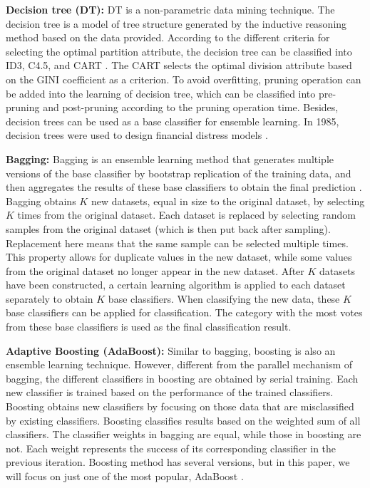 \documentclass[review]{elsarticle}
\begin{document}
\textbf{Decision tree (DT):} DT is a non-parametric data mining technique. The decision tree is a model of tree structure generated by the inductive reasoning method based on the data provided. According to the different criteria for selecting the optimal partition attribute, the decision tree can be classified into ID3, C4.5, and CART \citep{breiman1984classification}. The CART selects the optimal division attribute based on the GINI coefficient as a criterion. To avoid overfitting, pruning operation can be added into the learning of decision tree, which can be classified into pre-pruning and post-pruning according to the pruning operation time. Besides, decision trees can be used as a base classifier for ensemble learning. In 1985, decision trees were used to design financial distress models \citep{Frydman1985}.

\textbf{Bagging:} Bagging is an ensemble learning method that generates multiple versions of the base classifier by bootstrap replication of the training data, and then aggregates the results of these base classifiers to obtain the final prediction \citep{Breiman1996}. Bagging obtains $K$ new datasets, equal in size to the original dataset, by selecting $K$ times from the original dataset. Each dataset is replaced by selecting random samples from the original dataset (which is then put back after sampling). Replacement here means that the same sample can be selected multiple times. This property allows for duplicate values in the new dataset, while some values from the original dataset no longer appear in the new dataset. After $K$ datasets have been constructed, a certain learning algorithm is applied to each dataset separately to obtain $K$ base classifiers. When classifying the new data, these $K$ base classifiers can be applied for classification. The category with the most votes from these base classifiers is used as the final classification result.

\textbf{Adaptive Boosting (AdaBoost):} Similar to bagging, boosting is also an ensemble learning technique. However, different from the parallel mechanism of bagging, the different classifiers in boosting are obtained by serial training. Each new classifier is trained based on the performance of the trained classifiers. Boosting obtains new classifiers by focusing on those data that are misclassified by existing classifiers. Boosting classifies results based on the weighted sum of all classifiers. The classifier weights in bagging are equal, while those in boosting are not. Each weight represents the success of its corresponding classifier in the previous iteration. Boosting method has several versions, but in this paper, we will focus on just one of the most popular, AdaBoost \citep{Freund1995}.
\end{document}
